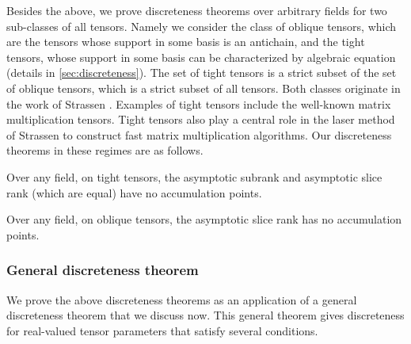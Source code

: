 \documentclass{daj}
\newcommand{\FF}{\mathbb{F}}
\begin{document}
Besides the above, we prove discreteness theorems over arbitrary fields for two sub-classes of all tensors. Namely we consider the class of oblique tensors, which are the tensors whose support in some basis is an antichain, and the tight tensors, whose support in some basis can be characterized by algebraic equation (details in \autoref{sec:discreteness}). 
The set of tight tensors is a strict subset of the set of oblique tensors, which is a strict subset of all tensors. 
Both classes originate in the work of Strassen \cite{MR882307,strassen1988asymptotic,strassen1991degeneration}. Examples of tight tensors include the well-known matrix multiplication tensors. Tight tensors also play a central role in the laser method of Strassen to construct fast matrix multiplication algorithms. Our discreteness theorems in these regimes are as follows.

\begin{theorem}
    Over any field, on tight tensors,  the asymptotic subrank and asymptotic slice rank (which are equal) have no accumulation points.
\end{theorem}

\begin{theorem}
    Over any field, on oblique tensors, the asymptotic slice rank has no accumulation points.
\end{theorem}

%
%

\subsubsection{General discreteness theorem}

We prove the above discreteness theorems as an application of a general discreteness theorem that we discuss now. This general theorem gives discreteness for real-valued tensor parameters that satisfy several conditions. 
\end{document}
